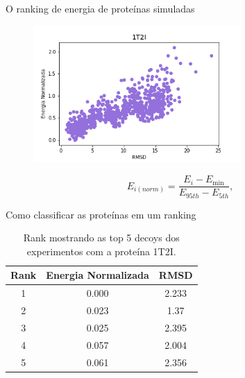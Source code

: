 \documentclass[10pt]{beamer}
\begin{document}
\begin{frame}{O ranking de energia de proteínas simuladas}
    \begin{figure}
        \centering
        \includegraphics[width=0.7\textwidth]{images/1t2i_tunnel.png}
    \end{figure}
    
    \begin{equation*}
        E_{i(norm)} = \frac{E_i - E_{\min}}{E_{95th} - E_{5th}},
    \end{equation*}
\end{frame}

\begin{frame}{Como classificar as proteínas em um ranking}
    \begin{table}[]
    \centering
    \caption{Rank mostrando as top 5 decoys dos experimentos com a proteína 1T2I.}
    \label{tab:protrank}
    \begin{tabular}{@{}ccc@{}}
        \toprule
        Rank & Energia Normalizada & RMSD  \\
        \midrule
        1    & 0.000             & 2.233 \\
        2    & 0.023             & 1.37  \\
        3    & 0.025             & 2.395 \\
        4    & 0.057             & 2.004 \\
        5    & 0.061             & 2.356 \\
        \bottomrule
    \end{tabular}
\end{table}
\end{frame}
\end{document}
